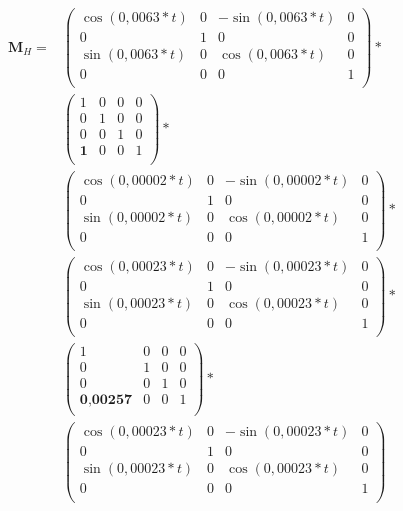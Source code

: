 \documentclass[a4paper,11pt,DIV11]{scrartcl}
\begin{document}
\begin{align}
\bm{M}_{H} = &
\begin{pmatrix} %
\cos(0,0063 * t) & 0 &-\sin(0,0063 * t) & 0 \\
0 & 1 & 0 & 0 \\
\sin(0,0063 * t) & 0 & \cos(0,0063 * t) & 0 \\
0 & 0 & 0 & 1 \\
\end{pmatrix} *
\\ &
\begin{pmatrix} %
1 & 0 & 0 & 0 \\
0 & 1 & 0 & 0 \\
0 & 0 & 1 & 0 \\
\textbf{1} & 0 & 0 & 1 \\
\end{pmatrix} * 
\\ &
\begin{pmatrix} %
\cos(0,00002 * t) & 0 & -\sin(0,00002 * t) & 0 \\
0 & 1 & 0 & 0 \\
\sin(0,00002 * t) & 0 & \cos(0,00002 * t) & 0 \\
0 & 0 & 0 & 1 \\
\end{pmatrix} *
\\ & 
\begin{pmatrix} %
\cos(0,00023 * t) & 0 &-\sin(0,00023 * t) & 0 \\
0 & 1 & 0 & 0 \\
\sin(0,00023 * t) & 0 & \cos(0,00023 * t) & 0 \\
0 & 0 & 0 & 1 \\
\end{pmatrix} * 
\\ & 
\begin{pmatrix} %
1 & 0 & 0 & 0 \\
0 & 1 & 0 & 0 \\
0 & 0 & 1 & 0 \\
\textbf{0,00257} & 0 & 0 & 1 \\
\end{pmatrix} * 
\\ &
\begin{pmatrix} %
\cos(0,00023 * t) & 0 & -\sin(0,00023 * t) & 0 \\
0 & 1 & 0 & 0 \\
\sin(0,00023 * t) & 0 & \cos(0,00023 * t) & 0 \\
0 & 0 & 0 & 1 \\
\end{pmatrix}
\end{align}
\end{document}
